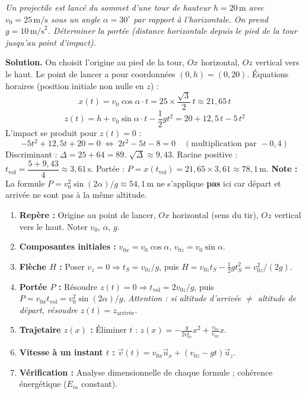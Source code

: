 \documentclass[11pt]{article}
\begin{document}
\begin{exoresolu}
\emph{Un projectile est lancé du sommet d'une tour de hauteur $h = 20\,\text{m}$ avec $v_0 = 25\,\text{m/s}$ sous un angle $\alpha = 30^\circ$ par rapport à l'horizontale. On prend $g = 10\,\text{m/s}^2$. Déterminer la portée (distance horizontale depuis le pied de la tour jusqu'au point d'impact).}

\tcblower
\textbf{Solution.}
On choisit l'origine au pied de la tour, $Ox$ horizontal, $Oz$ vertical vers le haut. Le point de lancer a pour coordonnées $(0, h) = (0, 20)$.
Équations horaires (position initiale non nulle en $z$) :
\[
x(t) = v_0\cos\alpha \cdot t = 25\times\frac{\sqrt{3}}{2}\,t \approx 21,65\,t
\]
\[
z(t) = h + v_0\sin\alpha \cdot t - \frac{1}{2}gt^2 = 20 + 12,5\,t - 5\,t^2
\]
L'impact se produit pour $z(t) = 0$ :
\[
-5t^2 + 12,5t + 20 = 0 \;\Longleftrightarrow\; 2t^2 - 5t - 8 = 0 \quad (\text{multiplication par } -0,4)
\]
Discriminant : $\Delta = 25 + 64 = 89$. $\sqrt{\Delta} \approx 9,43$.
Racine positive : $t_{\text{vol}} = \dfrac{5 + 9,43}{4} \approx 3,61\,\text{s}$.
Portée : $P = x(t_{\text{vol}}) = 21,65 \times 3,61 \approx \boxed{78,1\,\text{m}}$.
\textbf{Note :} La formule $P = v_0^2\sin(2\alpha)/g \approx 54,1\,\text{m}$ ne s'applique \textbf{pas} ici car départ et arrivée ne sont pas à la même altitude.
\end{exoresolu}

\begin{methode}
\begin{enumerate}
\item \textbf{Repère :} Origine au point de lancer, $Ox$ horizontal (sens du tir), $Oz$ vertical vers le haut. Noter $v_0$, $\alpha$, $g$.
\item \textbf{Composantes initiales :} $v_{0x} = v_0\cos\alpha$, $v_{0z} = v_0\sin\alpha$.
\item \textbf{Flèche $H$ :} Poser $v_z=0 \Rightarrow t_S = v_{0z}/g$, puis $H = v_{0z}t_S - \frac{1}{2}gt_S^2 = v_{0z}^2/(2g)$.
\item \textbf{Portée $P$ :} Résoudre $z(t)=0 \Rightarrow t_{\text{vol}} = 2v_{0z}/g$, puis $P = v_{0x}t_{\text{vol}} = v_0^2\sin(2\alpha)/g$. \emph{Attention : si altitude d'arrivée $\neq$ altitude de départ, résoudre $z(t)=z_{\text{arrivée}}$.}
\item \textbf{Trajetaire $z(x)$ :} Éliminer $t$ : $z(x) = -\frac{g}{2v_{0x}^2}x^2 + \frac{v_{0z}}{v_{0x}}x$.
\item \textbf{Vitesse à un instant $t$ :} $\vec{v}(t) = v_{0x}\vec{u}_x + (v_{0z}-gt)\vec{u}_z$.
\item \textbf{Vérification :} Analyse dimensionnelle de chaque formule ; cohérence énergétique ($E_m$ constant).
\end{enumerate}
\end{methode}
\end{document}

